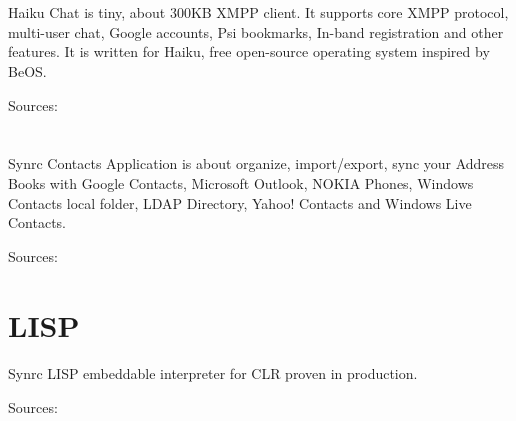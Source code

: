 \documentclass[11pt]{article}
\begin{document}
\section*{}
\paragraph{}
Haiku Chat is tiny, about 300KB XMPP client.
It supports core XMPP protocol, multi-user chat, Google accounts,
Psi bookmarks, In-band registration and other features.
It is written for Haiku, free open-source operating system inspired by BeOS.

Sources: 

\section*{}
\paragraph{}
Synrc Contacts Application is about organize,
import/export, sync your Address Books with Google Contacts,
Microsoft Outlook, NOKIA Phones, Windows Contacts local folder,
LDAP Directory, Yahoo! Contacts and Windows Live Contacts.

Sources: 

\section*{LISP}
\paragraph{}
Synrc LISP embeddable interpreter for CLR proven in production.

Sources: 

\end{document}
